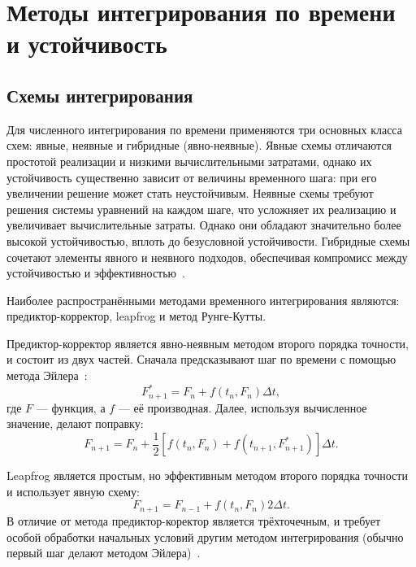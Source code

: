 \section{Методы интегрирования по времени и устойчивость}

\subsection{Схемы интегрирования}

Для численного интегрирования по времени применяются три основных класса схем: явные, неявные и гибридные (явно-неявные). 
%
Явные схемы отличаются простотой реализации и низкими вычислительными затратами, 
однако их устойчивость существенно зависит от величины временного шага: 
при его увеличении решение может стать неустойчивым.
%
Неявные схемы требуют решения системы уравнений на каждом шаге, 
что усложняет их реализацию и увеличивает вычислительные затраты. 
Однако они обладают значительно более высокой устойчивостью, вплоть до безусловной устойчивости.
%
Гибридные схемы сочетают элементы явного и неявного подходов, 
обеспечивая компромисс между устойчивостью и эффективностью~\cite{Ferziger2002}.

Наиболее распространёнными методами временного интегрирования являются: предиктор-корректор, leapfrog и метод Рунге-Кутты.

Предиктор-корректор является явно-неявным методом второго порядка точности, и состоит из двух частей.
Сначала предсказывают шаг по времени с помощью метода Эйлера~\cite{Ferziger2002}:
%
\begin{equation}
    F^{*}_{n+1} = F_{n} + f(t_{n}, F_{n}) \Delta t,
\end{equation}
%
где $F$ --- функция, а $f$ --- её производная. 
Далее, используя вычисленное значение, делают поправку:
%
\begin{equation}
    F_{n+1} = F_{n} + \frac{1}{2} \left[ f(t_{n}, F_{n}) + f(t_{n+1}, F^{*}_{n+1}) \right] \Delta t.
\end{equation}

Leapfrog является простым, но эффективным методом второго порядка точности и использует явную схему:
%
\begin{equation}\label{eq:leapfrog}
    F_{n+1} = F_{n-1} + f(t_{n}, F_{n}) 2\Delta t.
\end{equation}
%
В отличие от метода предиктор-коректор является трёхточечным, и требует особой обработки начальных условий другим методом интегрирования 
(обычно первый шаг делают методом Эйлера)~\cite{Liu2003}.


